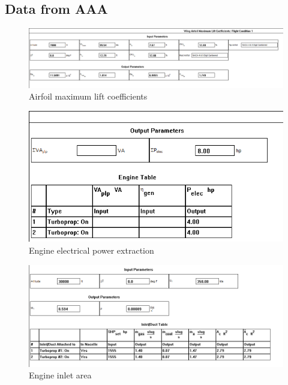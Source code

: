 \documentclass[conf]{new-aiaa}
\begin{document}
\subsection*{Data from AAA}
\begin{figure}[H]
	\centering
	\includegraphics[width=\textwidth]{TwinSeaLionReport2Printouts/AirfoilMaximumLiftCoefficients}
	\caption{Airfoil maximum lift coefficients}
	\label{fig:AirfoilMaximumLiftCoefficients}
\end{figure}
\begin{figure}[H]
	\centering
	\includegraphics[width=\textwidth]{TwinSeaLionReport2Printouts/engineelecpowerextraction}
	\caption{Engine electrical power extraction}
	\label{fig:engineelecpowerextraction}
\end{figure}
\begin{figure}[H]
	\centering
	\includegraphics[width=\textwidth]{TwinSeaLionReport2Printouts/engineInletArea}
	\caption{Engine inlet area}
	\label{fig:engineInletArea}
\end{figure}
\end{document}

